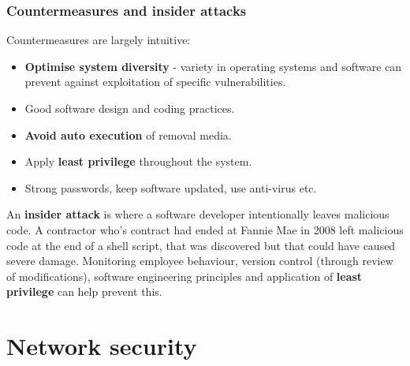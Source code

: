 \documentclass[final]{article}
\begin{document}
\subsubsection{Countermeasures and insider attacks}
Countermeasures are largely intuitive:
\begin{itemize}
	\item \textbf{Optimise system diversity} - variety in operating systems and software can prevent against exploitation of specific vulnerabilities.
	\item Good software design and coding practices.
	\item \textbf{Avoid auto execution} of removal media.
	\item Apply \textbf{least privilege} throughout the system.
	\item Strong passwords, keep software updated, use anti-virus etc.
\end{itemize}
An \textbf{insider attack} is where a software developer intentionally leaves malicious code. A contractor who's contract had ended at Fannie Mae in 2008 left malicious code at the end of a shell script, that was discovered but that could have caused severe damage. Monitoring employee behaviour, version control (through review of modifications), software engineering principles and application of \textbf{least privilege} can help prevent this.

\section{Network security}
\end{document}
